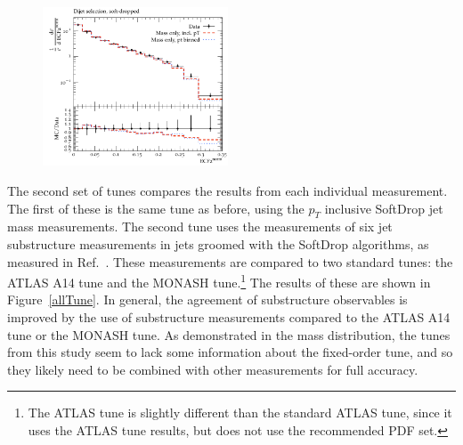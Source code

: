 \begin{figure}
\begin{center}
\includegraphics[width=0.49\textwidth]{figs/RivetPlotsMassOnly/ATLAS_2019_I1724098/d27-x01-y01.pdf} \hfill
\end{center}
\label{massOnlyTune}
\end{figure}


The second set of tunes compares the results from each individual measurement. The first of these is the same tune as before, using the $p_T$ inclusive SoftDrop jet mass measurements.
The second tune uses the measurements of six jet substructure measurements in jets groomed with the SoftDrop algorithms, as measured in Ref.~\cite{Aaboud:2019aii}.
These measurements are compared to two standard tunes: the ATLAS A14 tune and the MONASH tune.\footnote{The ATLAS tune is slightly different than the standard ATLAS tune, since it uses the ATLAS tune results, but does not use the recommended PDF set.}
The results of these are shown in Figure~\ref{allTune}. 
In general, the agreement of substructure observables is improved by the use of substructure measurements compared to the ATLAS A14 tune or the MONASH tune.
As demonstrated in the mass distribution, the tunes from this study seem to lack some information about the fixed-order tune, 
and so they likely need to be combined with other measurements for full accuracy. 


